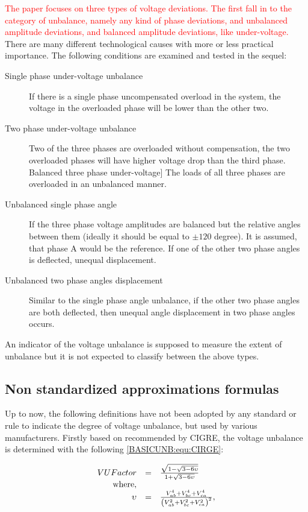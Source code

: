         \textcolor{red}{The paper focuses on three types of voltage deviations. The first fall in to the category of unbalance, namely any kind of phase deviations, and unbalanced amplitude deviations, and balanced amplitude deviations, like under-voltage.} There are many different technological causes with more or less practical importance. The following conditions are examined and tested in the sequel:
        \begin{description}
        \item[Single phase under-voltage unbalance]  If there is a single phase uncompensated overload in the system, the voltage in the overloaded phase will be lower than the other two.
        \item[Two phase under-voltage unbalance]  Two of the three phases are overloaded without compensation, the two overloaded phases will have higher voltage drop than the third phase.
        Balanced three phase under-voltage]  The loads of all three phases are overloaded in an unbalanced manner.
        \item[Unbalanced single phase angle]  If the three phase voltage amplitudes are balanced but the relative angles between them (ideally it should be equal to $\pm120$ degree). It is assumed, that phase A would be the reference. If one of the other two phase angles is deflected, unequal displacement.
        \item[Unbalanced two phase angles displacement] Similar to the single phase angle unbalance, if the other two phase angles are both deflected, then unequal angle displacement in two phase angles occurs.
        \end{description}
        An indicator of the voltage unbalance is supposed to measure the extent of unbalance but it is not expected to classify between the above types.
	
	\subsection{Non standardized approximations formulas}
	
	Up to now, the following definitions have not been adopted by any standard or rule to indicate the degree of voltage unbalance, but used by various manufacturers. Firstly based on \cite{eugene1986new} recommended by CIGRE, the voltage unbalance is determined with the following \ref{BASICUNB:equ:CIRGE}:
	
	\begin{equation}
        \begin{array}{rcl}
            VUFactor&=&\frac{\sqrt{{1-\sqrt{3-6\upsilon}}}}{1+\sqrt{3-6\upsilon}}\\
						\textnormal{where},&&\\
						\upsilon&=&\frac{V_{ab}^4+V_{bc}^4+V_{ca}^4}{\left(V_{ab}^2+V_{bc}^2+V_{ca}^2\right)^2},					
        \end{array}
        \label{BASICUNB:equ:CIRGE}
    \end{equation}
		
